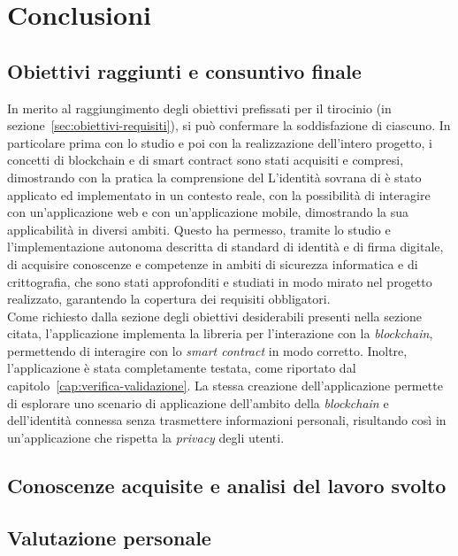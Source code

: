 \chapter{Conclusioni}\label{cap:conclusioni}


\section{Obiettivi raggiunti e consuntivo finale}\label{sec:conclusioni-obiettivi-consuntivo}

In merito al raggiungimento degli obiettivi prefissati per il tirocinio (in sezione~\ref{sec:obiettivi-requisiti}),
si può confermare la soddisfazione di ciascuno. In particolare prima con lo studio e poi con la realizzazione dell'intero progetto,
i concetti di blockchain e di smart contract sono stati acquisiti e compresi, dimostrando con la pratica la comprensione del
L'identità sovrana di  è stato applicato ed implementato in un contesto reale, con la possibilità di
interagire con un'applicazione web e con un'applicazione mobile, dimostrando la sua applicabilità in diversi ambiti.
Questo ha permesso, tramite lo studio e l'implementazione autonoma descritta di standard di identità e di firma digitale, di 
acquisire conoscenze e competenze in ambiti di sicurezza informatica e di crittografia, che sono stati approfonditi e studiati
in modo mirato nel progetto realizzato, garantendo la copertura dei requisiti obbligatori. \\

Come richiesto dalla sezione degli obiettivi desiderabili presenti nella sezione citata, l'applicazione implementa la libreria 
 per l'interazione con la \textit{blockchain}, permettendo di interagire con lo \textit{smart contract} in modo corretto.
Inoltre, l'applicazione è stata completamente testata, come riportato dal capitolo~\ref{cap:verifica-validazione}. 
La stessa creazione dell'applicazione permette di esplorare uno scenario di applicazione dell'ambito della \textit{blockchain} e dell'identità connessa
senza trasmettere informazioni personali, risultando così in un'applicazione che rispetta la \textit{privacy} degli utenti.

\section{Conoscenze acquisite e analisi del lavoro svolto}\label{sec:conclusioni-conoscenze-lavoro}

\section{Valutazione personale}\label{sec:conclusioni-valutazione}